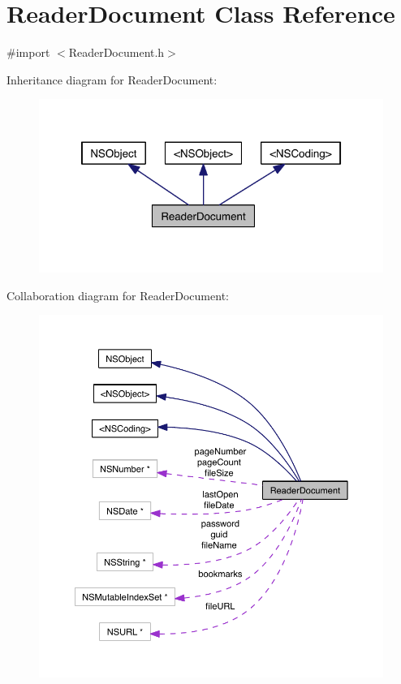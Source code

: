 \hypertarget{interface_reader_document}{\section{Reader\-Document Class Reference}
\label{dc/d78/interface_reader_document}
}


{\ttfamily \#import $<$Reader\-Document.\-h$>$}



Inheritance diagram for Reader\-Document\-:
\nopagebreak
\begin{figure}[H]
\begin{center}
\leavevmode
\includegraphics[width=318pt]{df/d61/interface_reader_document__inherit__graph}
\end{center}
\end{figure}


Collaboration diagram for Reader\-Document\-:
\nopagebreak
\begin{figure}[H]
\begin{center}
\leavevmode
\includegraphics[width=350pt]{d6/d66/interface_reader_document__coll__graph}
\end{center}
\end{figure}
